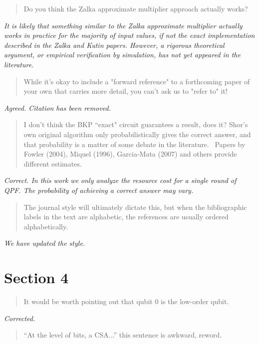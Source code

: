 \documentclass{article}
\theoremstyle{plain} \newtheorem{lemma}{Lemma}
\begin{document}
\begin{quote}
Do you think the Zalka approximate multiplier approach actually works?
\end{quote}

{\it It is likely that something similar to the Zalka approximate
multiplier actually works in practice for the majority of input values,
if not the exact implementation described in
the Zalka and Kutin papers. However, a rigorous theoretical argument, or
empirical verification by simulation, has not yet appeared in the literature.
}

\begin{quote}
While it's okay to include a "forward reference" to a forthcoming
paper of your own that carries more detail, you can't ask us to "refer
to" it!
\end{quote}

{\it Agreed. Citation has been removed.}

\begin{quote}
I don't think the BKP ``exact" circuit guarantees a result, does it?
Shor's own original algorithm only probabilistically gives the correct
answer, and that probability is a matter of some debate in the
literature.  Papers by Fowler (2004), Miquel (1996), Garcia-Mata
(2007) and others provide different estimates.
\end{quote}

{\it Correct.  In this work we only analyze the resource cost for a single round of QPF.  The probability of achieving a correct answer may vary.}

\begin{quote}
The journal style will ultimately dictate this, but when the
bibliographic labels in the text are alphabetic, the references are
usually ordered alphabetically.
\end{quote}

{\it We have updated the style.}

\section{Section 4}

\begin{quote}
It would be worth pointing out that qubit 0 is the low-order qubit.
\end{quote}

{\it Corrected.}

\begin{quote}
``At the level of bits, a CSA...'' this sentence is awkward, reword.
\end{quote}
\end{document}
